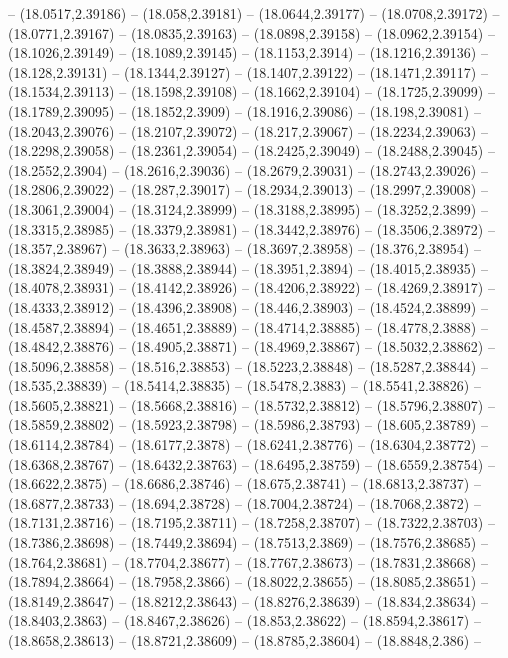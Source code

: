 {-- (18.0517,2.39186) -- (18.058,2.39181) -- (18.0644,2.39177) -- (18.0708,2.39172) -- (18.0771,2.39167) -- (18.0835,2.39163) -- (18.0898,2.39158) -- (18.0962,2.39154) -- (18.1026,2.39149) -- (18.1089,2.39145) -- (18.1153,2.3914) -- (18.1216,2.39136)
-- (18.128,2.39131) -- (18.1344,2.39127) -- (18.1407,2.39122) -- (18.1471,2.39117) -- (18.1534,2.39113) -- (18.1598,2.39108) -- (18.1662,2.39104) -- (18.1725,2.39099) -- (18.1789,2.39095) -- (18.1852,2.3909) -- (18.1916,2.39086) -- (18.198,2.39081)
-- (18.2043,2.39076) -- (18.2107,2.39072) -- (18.217,2.39067) -- (18.2234,2.39063) -- (18.2298,2.39058) -- (18.2361,2.39054) -- (18.2425,2.39049) -- (18.2488,2.39045) -- (18.2552,2.3904) -- (18.2616,2.39036) -- (18.2679,2.39031) -- (18.2743,2.39026)
-- (18.2806,2.39022) -- (18.287,2.39017) -- (18.2934,2.39013) -- (18.2997,2.39008) -- (18.3061,2.39004) -- (18.3124,2.38999) -- (18.3188,2.38995) -- (18.3252,2.3899) -- (18.3315,2.38985) -- (18.3379,2.38981) -- (18.3442,2.38976) -- (18.3506,2.38972)
-- (18.357,2.38967) -- (18.3633,2.38963) -- (18.3697,2.38958) -- (18.376,2.38954) -- (18.3824,2.38949) -- (18.3888,2.38944) -- (18.3951,2.3894) -- (18.4015,2.38935) -- (18.4078,2.38931) -- (18.4142,2.38926) -- (18.4206,2.38922) -- (18.4269,2.38917)
-- (18.4333,2.38912) -- (18.4396,2.38908) -- (18.446,2.38903) -- (18.4524,2.38899) -- (18.4587,2.38894) -- (18.4651,2.38889) -- (18.4714,2.38885) -- (18.4778,2.3888) -- (18.4842,2.38876) -- (18.4905,2.38871) -- (18.4969,2.38867) -- (18.5032,2.38862)
-- (18.5096,2.38858) -- (18.516,2.38853) -- (18.5223,2.38848) -- (18.5287,2.38844) -- (18.535,2.38839) -- (18.5414,2.38835) -- (18.5478,2.3883) -- (18.5541,2.38826) -- (18.5605,2.38821) -- (18.5668,2.38816) -- (18.5732,2.38812) -- (18.5796,2.38807)
-- (18.5859,2.38802) -- (18.5923,2.38798) -- (18.5986,2.38793) -- (18.605,2.38789) -- (18.6114,2.38784) -- (18.6177,2.3878) -- (18.6241,2.38776) -- (18.6304,2.38772) -- (18.6368,2.38767) -- (18.6432,2.38763) -- (18.6495,2.38759) -- (18.6559,2.38754)
-- (18.6622,2.3875) -- (18.6686,2.38746) -- (18.675,2.38741) -- (18.6813,2.38737) -- (18.6877,2.38733) -- (18.694,2.38728) -- (18.7004,2.38724) -- (18.7068,2.3872) -- (18.7131,2.38716) -- (18.7195,2.38711) -- (18.7258,2.38707) -- (18.7322,2.38703)
-- (18.7386,2.38698) -- (18.7449,2.38694) -- (18.7513,2.3869) -- (18.7576,2.38685) -- (18.764,2.38681) -- (18.7704,2.38677) -- (18.7767,2.38673) -- (18.7831,2.38668) -- (18.7894,2.38664) -- (18.7958,2.3866) -- (18.8022,2.38655) -- (18.8085,2.38651)
-- (18.8149,2.38647) -- (18.8212,2.38643) -- (18.8276,2.38639) -- (18.834,2.38634) -- (18.8403,2.3863) -- (18.8467,2.38626) -- (18.853,2.38622) -- (18.8594,2.38617) -- (18.8658,2.38613) -- (18.8721,2.38609) -- (18.8785,2.38604) -- (18.8848,2.386) --
}
